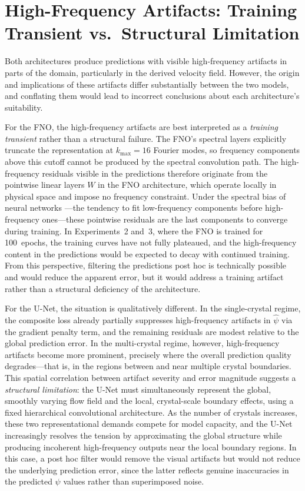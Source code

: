 \section{High-Frequency Artifacts: Training Transient vs.\ Structural Limitation}

Both architectures produce predictions with visible high-frequency artifacts in parts of the domain, particularly in the derived velocity field. However, the origin and implications of these artifacts differ substantially between the two models, and conflating them would lead to incorrect conclusions about each architecture's suitability.

For the FNO, the high-frequency artifacts are best interpreted as a \emph{training transient} rather than a structural failure. The FNO's spectral layers explicitly truncate the representation at $k_{\max} = 16$ Fourier modes, so frequency components above this cutoff cannot be produced by the spectral convolution path. The high-frequency residuals visible in the predictions therefore originate from the pointwise linear layers $W$ in the FNO architecture, which operate locally in physical space and impose no frequency constraint. Under the spectral bias of neural networks \parencite{qin_toward_2024}—the tendency to fit low-frequency components before high-frequency ones—these pointwise residuals are the last components to converge during training. In Experiments~2 and~3, where the FNO is trained for 100~epochs, the training curves have not fully plateaued, and the high-frequency content in the predictions would be expected to decay with continued training. From this perspective, filtering the predictions post hoc is technically possible and would reduce the apparent error, but it would address a training artifact rather than a structural deficiency of the architecture.

For the U-Net, the situation is qualitatively different. In the single-crystal regime, the composite loss already partially suppresses high-frequency artifacts in $\hat\psi$ via the gradient penalty term, and the remaining residuals are modest relative to the global prediction error. In the multi-crystal regime, however, high-frequency artifacts become more prominent, precisely where the overall prediction quality degrades—that is, in the regions between and near multiple crystal boundaries. This spatial correlation between artifact severity and error magnitude suggests a \emph{structural limitation}: the U-Net must simultaneously represent the global, smoothly varying flow field and the local, crystal-scale boundary effects, using a fixed hierarchical convolutional architecture. As the number of crystals increases, these two representational demands compete for model capacity, and the U-Net increasingly resolves the tension by approximating the global structure while producing incoherent high-frequency outputs near the local boundary regions. In this case, a post hoc filter would remove the visual artifacts but would not reduce the underlying prediction error, since the latter reflects genuine inaccuracies in the predicted $\psi$ values rather than superimposed noise.

